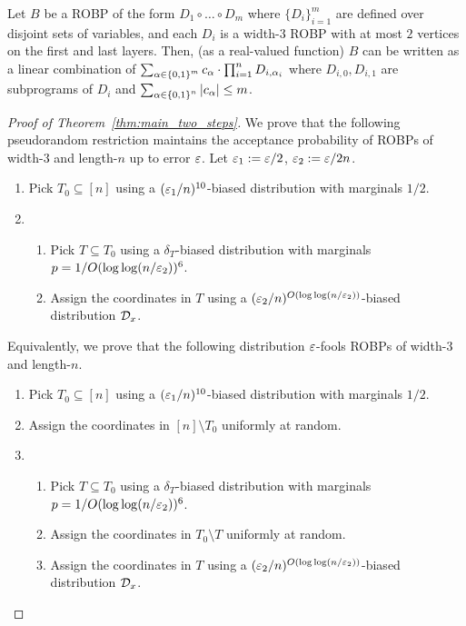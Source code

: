 \begin{theorem}
	\label{thm:BDVY}
	Let $B$ be a ROBP of the form $D_1\circ \ldots \circ D_m$  where $\{D_i\}_{i=1}^{m}$ are defined over disjoint sets of %
	variables, and each $D_i$ is a width-$3$ ROBP with at most $2$ vertices on the first and last layers.
	Then, (as a real-valued function) $B$ can be written as a linear combination of 
	$\sum_{\alpha \in {\{0,1\}}^m} c_{\alpha} \cdot \prod_{i=1}^{n} D_{i,\alpha_i}$
	where $D_{i,0}, D_{i,1}$ are subprograms of $D_{i}$ and $\sum_{\alpha\in {\{0,1\}}^n}{|c_\alpha|} \le m$.
	\end{theorem}


\begin{proof}[Proof of Theorem~\ref{thm:main_two_steps}]
We prove that the following pseudorandom restriction maintains the acceptance probability of ROBPs of width-$3$ and length-$n$ up to error $\varepsilon$.
Let $\varepsilon_1 := \varepsilon/2$, $\varepsilon_2 := \varepsilon/2n$.
\begin{enumerate}
	\item Pick $T_0 \subseteq [n]$ using a $(\varepsilon_1/n)^{10}$-biased distribution with marginals $1/2$.
	\item
	\begin{enumerate}
	\item Pick $T\subseteq T_0$ using a $\delta_T$-biased distribution with marginals $p = 1/O(\log \log ( n/\varepsilon_2))^{6}$.
	\item Assign the coordinates in $T$ using a $(\varepsilon_2/n)^{O(\log \log (n/\varepsilon_2))}$-biased distribution ${\mathcal{D}}_x$.
	\end{enumerate}
\end{enumerate}
%
Equivalently, we prove that the following distribution $\varepsilon$-fools ROBPs of width-$3$ and length-$n$.
\begin{enumerate}
	\item Pick $T_0 \subseteq [n]$ using a $(\varepsilon_1/n)^{10}$-biased distribution with marginals $1/2$.
	\item Assign the coordinates in $[n]\setminus T_0$ uniformly at random.
	\item
	\begin{enumerate}
	\item Pick $T\subseteq T_0$ using a $\delta_T$-biased distribution with marginals $p = 1/O(\log \log ( n/\varepsilon_2))^{6}$.
	\item  Assign the coordinates in $T_0\setminus T$ uniformly at random.
	\item Assign the coordinates in $T$ using a $(\varepsilon_2/n)^{O(\log \log (n/\varepsilon_2))}$-biased distribution ${\mathcal{D}_x}$.
	\end{enumerate}
\end{enumerate}


\end{proof}
